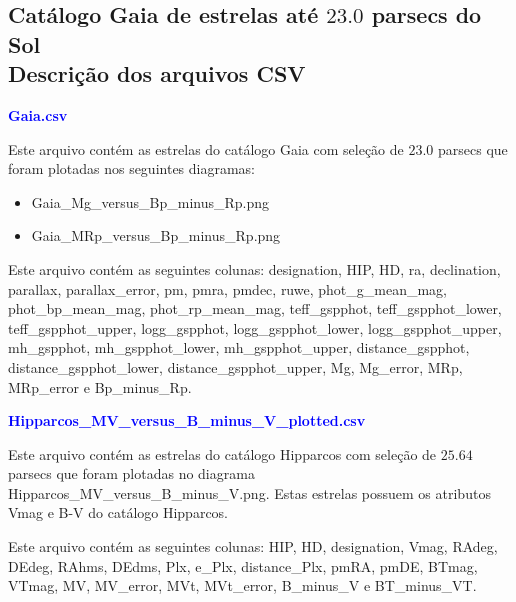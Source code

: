 \documentclass{article}
\begin{document}
	\begin{center}
		\section*{\normalsize  Catálogo Gaia de estrelas até $23.0$ parsecs do Sol\\ \small Descrição dos arquivos CSV}
	\end{center}
	\vspace{50pt}
	
	\textcolor{blue}{\textbf{Gaia.csv}}
	
	\vspace{10pt}
	
	Este arquivo contém as estrelas do catálogo Gaia com seleção de $23.0$ parsecs que foram plotadas nos seguintes diagramas:
	
	\vspace{10pt}
	
	\begin{itemize}
		\item Gaia\_Mg\_versus\_Bp\_minus\_Rp.png
		\item Gaia\_MRp\_versus\_Bp\_minus\_Rp.png
	\end{itemize}

	Este arquivo contém as seguintes colunas:
	designation, HIP, HD, ra, declination, parallax, parallax\_error, pm, pmra, pmdec, ruwe, phot\_g\_mean\_mag, phot\_bp\_mean\_mag, phot\_rp\_mean\_mag, teff\_gspphot, teff\_gspphot\_lower, teff\_gspphot\_upper, logg\_gspphot, logg\_gspphot\_lower, logg\_gspphot\_upper, mh\_gspphot, mh\_gspphot\_lower, mh\_gspphot\_upper, distance\_gspphot, distance\_gspphot\_lower, distance\_gspphot\_upper, Mg, Mg\_error, MRp, MRp\_error e Bp\_minus\_Rp.
	
	\vspace{10pt}
	
	\textcolor{blue}{\textbf{Hipparcos\_MV\_versus\_B\_minus\_V\_plotted.csv}}
	
	\vspace{10pt}
	
	Este arquivo contém as estrelas do catálogo Hipparcos com seleção de $25.64$ parsecs que foram plotadas no diagrama Hipparcos\_MV\_versus\_B\_minus\_V.png.
	Estas estrelas possuem os atributos Vmag e B-V do catálogo Hipparcos.
	
	Este arquivo contém as seguintes colunas:
	HIP, HD, designation, Vmag, RAdeg, DEdeg, RAhms, DEdms, Plx, e\_Plx, distance\_Plx, pmRA, pmDE, BTmag, VTmag, MV, MV\_error, MVt, MVt\_error, B\_minus\_V e BT\_minus\_VT.
	
\end{document}

